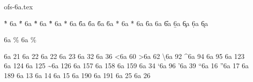 
 
\protectreading ofs-6a.tex %

\accentdef  \` *    6a  {}
\accentdef  \' *    6a  {}
\accentdef  \^ *    6a  {}
\accentdef  \~ *    6a  {}
\accentdef  \" *    6a  {}
\accentdef  \H *    6a  {}
\accentdef  \r *    6a  {}
\accentdef  \v *    6a  {}
\accentdef  \u *    6a  {}
\accentdef  \= *    6a  {}
\accentdef  \. *    6a  {}
\accentdef  \f *    6a  {}
\accentdef  \C *    6a  {}
\accentdef  \U *    6a  {}
\accentdef  \b *    6a  {}
\accentdef  \c *    6a  {}
\accentdef  \d *    6a  {}
\accentdef  \k *    6a  {}

\let\promile=\relax
\characterdef \promile          6a {\% }        
\characterdef \pertenthousand   6a {\% } 

\characterdef \textendash         6a   21
\characterdef \cyrdash            6a   22
\characterdef \textemdash         6a   22
\characterdef \textcompwordmark   6a   23
\characterdef \textvisiblespace   6a   32
\characterdef \textdollar         6a   36
\characterdef \textless           6a   60
\characterdef \textgreater        6a   62
\characterdef \textbackslash      6a   92
\characterdef \textasciicircum    6a   94
\characterdef \textunderscore     6a   95
\characterdef \textbraceleft      6a   123
\characterdef \textbar            6a   124
\characterdef \textbraceright     6a   125
\characterdef \textasciitilde     6a   126
\characterdef \textnumero         6a   157
\characterdef \textcurrency       6a   158
\characterdef \textsection        6a   159
\characterdef \textquotedbl       6a   34
\characterdef \textquoteleft      6a   96
\characterdef \textquoteright     6a   39
\characterdef \textquotedblleft   6a   16
\characterdef \textquotedblright  6a   17
\characterdef \quotedblbase       6a   189
\characterdef \CYRpalochka        6a   13
\characterdef \cyrlangle          6a   14
\characterdef \cyrrangle          6a   15
\characterdef \guillemotleft      6a   190
\characterdef \guillemotright     6a   191
\characterdef \dotlessi           6a   25
\characterdef \dotlessj           6a   26


